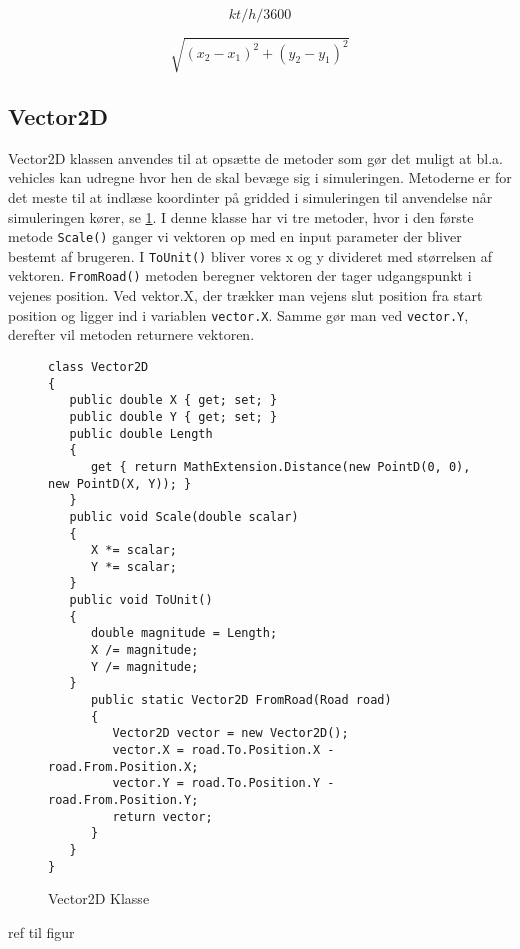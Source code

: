 \begin{equation} \label{ConvertKthToMms}
kt/h / 3600
\end{equation}

\begin{equation} \label{AfstandsFormel}
\sqrt{(x_2 - x_1)^2 + (y_2 - y_1)^2}
\end{equation}

\subsection{Vector2D}
Vector2D klassen anvendes til at opsætte de metoder som gør det muligt at bl.a. vehicles kan udregne hvor hen de skal bevæge sig i simuleringen. Metoderne er for det meste til at indlæse koordinter på gridded i simuleringen til anvendelse når simuleringen kører, se \ref{MathExtensionClass}. I denne klasse har vi tre metoder, hvor i den første metode \texttt{Scale()} ganger vi vektoren op med en input parameter der bliver bestemt af brugeren. I \texttt{ToUnit()} bliver vores x og y divideret med størrelsen af vektoren. \texttt{FromRoad()} metoden beregner vektoren der tager udgangspunkt i vejenes position. Ved vektor.X, der trækker man vejens slut position fra start position og ligger ind i variablen \texttt{vector.X}. Samme gør man ved \texttt{vector.Y}, derefter vil metoden returnere vektoren.

\begin{figure}[H]
\begin{lstlisting}
class Vector2D
{
   public double X { get; set; }
   public double Y { get; set; }
   public double Length
   {
      get { return MathExtension.Distance(new PointD(0, 0), new PointD(X, Y)); }
   }
   public void Scale(double scalar)
   {
      X *= scalar;
      Y *= scalar;
   }
   public void ToUnit()
   {
      double magnitude = Length;
      X /= magnitude;
      Y /= magnitude;
   }
      public static Vector2D FromRoad(Road road)
      {
         Vector2D vector = new Vector2D();
         vector.X = road.To.Position.X - road.From.Position.X;
         vector.Y = road.To.Position.Y - road.From.Position.Y;
         return vector;
      }
   }
}
\end{lstlisting}
\caption{Vector2D Klasse}\label{MathExtensionClass}
\end{figure}

ref til figur